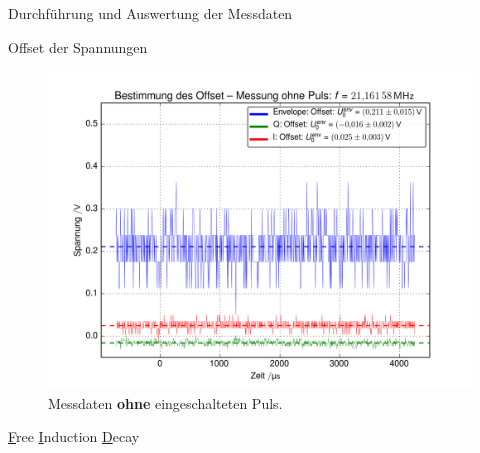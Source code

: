 \documentclass[pdftex, a4paper,11pt, twoside, ngerman]{report}
\begin{document}
  
  \newpage
  \begin{chapter}{Durchführung und Auswertung der Messdaten}
    \label{chp:Auswertung}
    
    
    
    \begin{section}{Offset der Spannungen}
      \label{chpOffset}
      
      
      \begin{figure}[htb]
        \centering
        \includegraphics[width=\textwidth]{Figures/Offset.png}
        \caption{Messdaten \textbf{ohne} eingeschalteten Puls.}
        \label{figOffset}
      \end{figure}
      
      
    \end{section}
    
    
    \newpage
    \begin{section}{
        \underline{F}ree \underline{I}nduction \underline{D}ecay}
      \label{chpFID}
      
      

\end{section}
\end{chapter}
\end{document}
